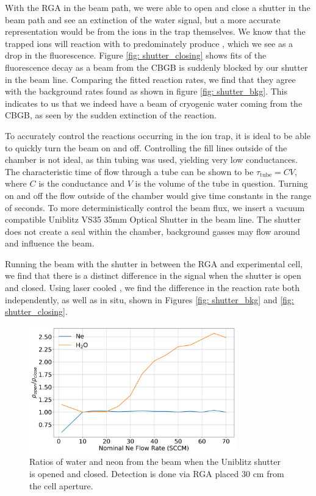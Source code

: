With the RGA in the beam path, we were able to open and close a shutter in the beam path and see an extinction of the water signal, but a more accurate representation would be from the ions in the trap themselves. We know that the trapped  ions will reaction with  to predominately produce , which we see as a drop in the fluorescence. Figure \ref{fig: shutter_closing} shows fits of the fluorescence decay as a beam from the CBGB is suddenly blocked by our shutter in the beam line. Comparing the fitted reaction rates, we find that they agree with the background rates found as shown in figure \ref{fig: shutter_bkg}. This indicates to us that we indeed have a beam of cryogenic water coming from the CBGB, as seen by the sudden extinction of the  reaction.

To accurately control the reactions occurring in the ion trap, it is ideal to be able to quickly turn the beam on and off. Controlling the fill lines outside of the chamber is not ideal, as thin tubing was used, yielding very low conductances. The characteristic time of flow through a tube can be shown to be $\tau_{\mathrm{tube}} = C V$, where $C$ is the conductance and $V$ is the volume of the tube in question. Turning on and off the flow outside of the chamber would give time constants in the range of seconds. To more deterministically control the beam flux, we insert a vacuum compatible Uniblitz VS35 35mm Optical Shutter in the beam line. The shutter does not create a seal within the chamber, background gasses may flow around and influence the beam.

Running the beam with the shutter in between the RGA and experimental cell, we find that there is a distinct difference in the  signal when the shutter is open and closed. Using laser cooled , we find the difference in the reaction rate both independently, as well as in situ, shown in Figures \ref{fig: shutter_bkg} and \ref{fig: shutter_closing}.

\begin{figure}[H]
	\centering
	\includegraphics[width=0.8\textwidth]{images/CBGB_RGA_contrast.png}
	\caption{Ratios of water and neon from the beam when the Uniblitz shutter is opened and closed. Detection is done via RGA placed 30 cm from the cell aperture.}
	\label{fig: RGA contrast}
\end{figure}

